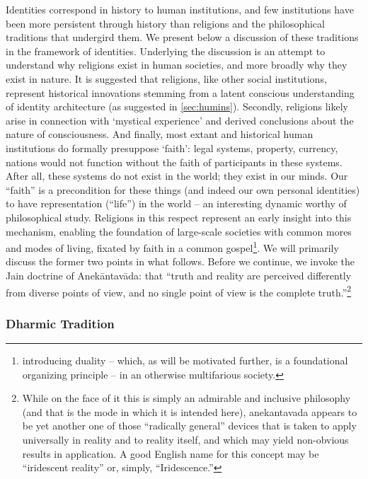 \documentclass[pra,twocolumn,groupedaddress,10pt]{revtex4}
\theoremstyle{definition}
\begin{document}
Identities correspond in history to human institutions, and few institutions have been more persistent through history than religions and the philosophical traditions that undergird them. We present below a discussion of these traditions in the framework of identities. Underlying the discussion is an attempt to understand why religions exist in human societies, and more broadly why they exist in nature. It is suggested that religions, like other social institutions, represent historical innovations stemming from a latent conscious understanding of identity architecture (as suggested in \autoref{sec:humins}). Secondly, religions likely arise in connection with `mystical experience' and derived conclusions about the nature of consciousness. And finally, most extant and historical human institutions do formally presuppose `faith': legal systems, property, currency, nations would not function without the faith of participants in these systems. After all, these systems do not exist in the world; they exist in our minds. Our ``faith'' is a precondition for these things (and indeed our own personal identities) to have representation (``life'') in the world -- an interesting dynamic worthy of philosophical study. Religions in this respect represent an early insight into this mechanism, enabling the foundation of large-scale societies with common mores and modes of living, fixated by faith in a common gospel\footnote{introducing duality -- which, as will be motivated further, is a foundational organizing principle -- in an otherwise multifarious society.}. We will primarily discuss the former two points in what follows. Before we continue, we invoke the Jain doctrine of Anek\={a}ntav\={a}da: that ``truth and reality are perceived differently from diverse points of view, and no single point of view is the complete truth.''\footnote{While on the face of it this is simply an admirable and inclusive philosophy (and that is the mode in which it is intended here), anekantavada appears to be yet another one of those ``radically general'' devices that is taken to apply universally in reality and to reality itself, and which may yield non-obvious results in application. A good English name for this concept may be ``iridescent reality'' or, simply, ``Iridescence.''}\cite{anekantavada}

\subsubsection{Dharmic Tradition} \label{sec:dhatra}
\end{document}
